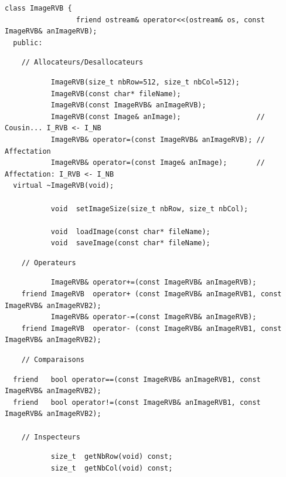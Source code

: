 \documentclass[12pt]{article}
\begin{document}
\vspace{-0.3cm}
\begin{footnotesize}
\begin{verbatim}
class ImageRVB {
                 friend ostream& operator<<(ostream& os, const ImageRVB& anImageRVB);
  public:
\end{verbatim}
\vspace{-0.3cm}
\begin{verbatim}
    // Allocateurs/Desallocateurs
\end{verbatim}
\vspace{-0.2cm}
\begin{verbatim}
           ImageRVB(size_t nbRow=512, size_t nbCol=512);
           ImageRVB(const char* fileName);
           ImageRVB(const ImageRVB& anImageRVB);
           ImageRVB(const Image& anImage);                  // Cousin... I_RVB <- I_NB
           ImageRVB& operator=(const ImageRVB& anImageRVB); // Affectation
           ImageRVB& operator=(const Image& anImage);       // Affectation: I_RVB <- I_NB
  virtual ~ImageRVB(void);

           void  setImageSize(size_t nbRow, size_t nbCol);

           void  loadImage(const char* fileName);
           void  saveImage(const char* fileName);
\end{verbatim}
\vspace{-0.2cm}
\begin{verbatim}
    // Operateurs
\end{verbatim}
\vspace{-0.2cm}
\begin{verbatim}
           ImageRVB& operator+=(const ImageRVB& anImageRVB);
    friend ImageRVB  operator+ (const ImageRVB& anImageRVB1, const ImageRVB& anImageRVB2);
           ImageRVB& operator-=(const ImageRVB& anImageRVB);
    friend ImageRVB  operator- (const ImageRVB& anImageRVB1, const ImageRVB& anImageRVB2);
\end{verbatim}
\vspace{-0.2cm}
\begin{verbatim}
    // Comparaisons
\end{verbatim}
\vspace{-0.2cm}
\begin{verbatim}
  friend   bool operator==(const ImageRVB& anImageRVB1, const ImageRVB& anImageRVB2);
  friend   bool operator!=(const ImageRVB& anImageRVB1, const ImageRVB& anImageRVB2); 

    // Inspecteurs
\end{verbatim}
\vspace{-0.2cm}
\begin{verbatim}
           size_t  getNbRow(void) const;
           size_t  getNbCol(void) const;


\end{verbatim}
\end{footnotesize}
\end{document}
